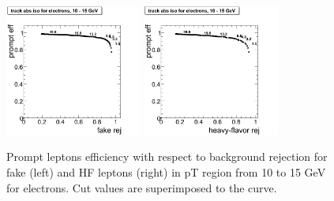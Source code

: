 \begin{figure}[htbp]
\begin{center}
 \includegraphics[width = 0.4\textwidth]{pictures/bkgdRej_sigEff/onlyTrack_elec_fake_ptCut1_ptCut2.png}
\includegraphics[width = 0.4\textwidth]{pictures/bkgdRej_sigEff/onlyTrack_elec_nonPrompt_ptCut1_ptCut2.png}
\caption{\small{Prompt leptons efficiency with respect to background 
rejection for fake (left) and HF leptons (right) in pT region
from 10 to 15 GeV for electrons. 
Cut values are superimposed to the curve.}\label{fig:rej_el2}}
\end{center}
\end{figure}


